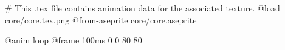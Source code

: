# This .tex file contains animation data for the associated texture.
@load core/core.tex.png
@from-aseprite core/core.aseprite

@anim loop
	@frame 100ms 0 0 80 80
